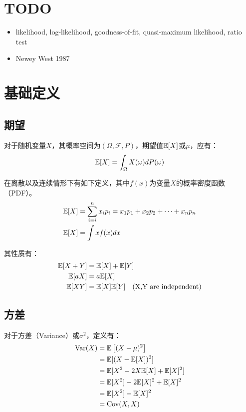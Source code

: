 \documentclass[11pt]{article}
\begin{document}
\maketitle
\tableofcontents

\section{TODO}
\begin{itemize}
    \item likelihood, log-likelihood, goodness-of-fit, quasi-maximum likelihood, ratio test
    \item Newey West 1987
\end{itemize}

\section{基础定义}

\subsection{期望}

对于随机变量$X$，其概率空间为$(\Omega,\mathcal{F},P)$，期望值$\mathbb{E}[X]$或$\mu$，应有：
\begin{equation*}
    \mathbb{E}[X] = \int_{\Omega} X(\omega) dP(\omega)
\end{equation*}

在离散以及连续情形下有如下定义，其中$f(x)$为变量$X$的概率密度函数（PDF）。
\begin{align*}
    \mathbb{E}[X] &= \sum_{i=i}^n x_i p_i =x_1 p_1 + x_2 p_2 + \dots + x_n p_n \\
    \mathbb{E}[X] &= \int x f(x) dx
\end{align*}

其性质有：
\begin{align*}
    \mathbb{E}[X+Y] &= \mathbb{E}[X] + \mathbb{E}[Y] \\
    \mathbb{E}[aX] &= a \mathbb{E}[X] \\
    \mathbb{E}[XY] &= \mathbb{E}[X]\mathbb{E}[Y] \quad \text{(X,Y are independent)}
\end{align*}

\subsection{方差}

对于方差（Variance）或$\sigma^2$，定义有：
\begin{align*}
    \operatorname{Var}(X) &= \mathbb{E}\left[ (X-\mu)^2 \right]\\
    &= \mathbb{E}[(X-\mathbb{E}[X])^2] \\
    &= \mathbb{E}[X^2 - 2X\mathbb{E}[X] + \mathbb{E}[X]^2] \\
    &= \mathbb{E}[X^2] - 2\mathbb{E}[X]^2 + \mathbb{E}[X]^2 \\
    &= \mathbb{E}[X^2] - \mathbb{E}[X]^2 \\
    &= \operatorname{Cov}(X,X)
\end{align*}
\end{document}
